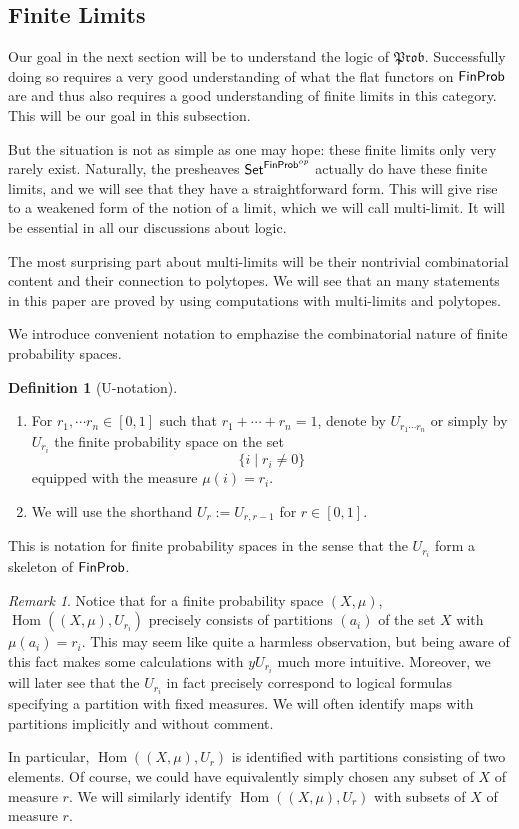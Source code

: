 \documentclass[a4paper]{amsproc}
\theoremstyle{plain}
\theoremstyle{definition}
\newtheorem{definition}[theorem]{Definition}
\theoremstyle{remark}
\newtheorem{remark}[theorem]{Remark}
\numberwithin{equation}{section}
\DeclareMathOperator{\Hom}{Hom}
\newcommand{\y}{\textit{y}}
\newcommand{\Set}{\textup{\textsf{Set}}}
\newcommand{\FinProb}{\textup{\textsf{FinProb}}}
\newcommand{\Prob}{\mathfrak{Prob}}
\begin{document}
\subsection{Finite Limits}

Our goal in the next section will be to understand the logic of $\Prob$. Successfully doing so requires a very good understanding of what the flat functors on $\FinProb$ are and thus also requires a good understanding of finite limits in this category. This will be our goal in this subsection.

But the situation is not as simple as one may hope: these finite limits only very rarely exist. Naturally, the presheaves $\Set^{\FinProb^{op}}$ actually do have these finite limits, and we will see that they have a straightforward form. This will give rise to a weakened form of the notion of a limit, which we will call multi-limit. It will be essential in all our discussions about logic.

The most surprising part about multi-limits will be their nontrivial combinatorial content and their connection to polytopes. We will see that an many statements in this paper are proved by using computations with multi-limits and polytopes.

We introduce convenient notation to emphazise the combinatorial nature of finite probability spaces.

\begin{definition}[U-notation] \label{U-notation}
\begin{enumerate}
\item For $r_1, \cdots r_n \in [0,1]$ such that $r_1 + \cdots + r_n = 1$, denote by $U_{r_1 \cdots r_n}$ or simply by $U_{r_i}$ the finite probability space on the set
\[
\{i \mid r_i \neq 0 \}
\]
equipped with the measure $\mu(i) = r_i$.
\item We will use the shorthand $U_r := U_{r,r-1}$ for $r \in [0,1]$.
\end{enumerate}
\end{definition}

This is notation for finite probability spaces in the sense that the $U_{r_i}$ form a skeleton of $\FinProb$.

\begin{remark}\label{classifying_partitions}
    Notice that for a finite probability space $(X,\mu)$, $\Hom((X,\mu), U_{r_i})$ precisely consists of partitions $(a_i)$ of the set $X$ with $\mu(a_i) = r_i$. This may seem like quite a harmless observation, but being aware of this fact makes some calculations with $\y U_{r_i}$ much more intuitive. Moreover, we will later see that the $U_{r_i}$ in fact precisely correspond to logical formulas specifying a partition with fixed measures. We will often identify maps with partitions implicitly and without comment.

    In particular, $\Hom((X,\mu), U_r)$ is identified with partitions consisting of two elements. Of course, we could have equivalently simply chosen any subset of $X$ of measure $r$. We will similarly identify $\Hom((X,\mu), U_r)$ with subsets of $X$ of measure $r$.

\end{remark}
\end{document}
